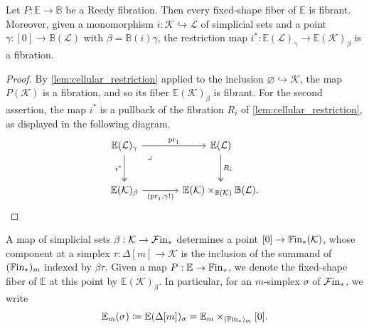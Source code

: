 \documentclass[10pt,reqno]{amsart}
\begin{document}
\begin{lemma}
\label{lem:fixed_shape_fiber_fibrant}
Let $P:\mathbb E\to\mathbb B$ be a Reedy fibration. Then every
fixed-shape fiber of $\mathbb E$ is fibrant. Moreover, given a
monomorphism $i:\mathcal K\hookrightarrow\mathcal L$ of simplicial
sets and a point $\gamma:[0]\to\mathbb B(\mathcal L)$ with
$\beta=\mathbb B(i)\gamma$, the restriction map
$i^*:\mathbb E(\mathcal L)_\gamma\to\mathbb E(\mathcal K)_\beta$ is
a fibration.
\end{lemma}
\begin{proof}
By \cref{lem:cellular_restriction} applied to the inclusion
$\varnothing\hookrightarrow\mathcal K$, the map $P(\mathcal K)$ is
a fibration, and so its fiber $\mathbb E(\mathcal K)_\beta$ is
fibrant. For the second assertion, the map $i^*$ is a pullback of
the fibration $R_i$ of \cref{lem:cellular_restriction}, as displayed
in the following diagram.
\[
\begin{tikzcd}[ampersand replacement=\&, sep=large]
\mathbb E(\mathcal L)_\gamma\arrow[r,"\pr_1"]
  \arrow[d,two heads,"i^*"']
  \arrow[dr,phantom,"\lrcorner",very near start]
\&\mathbb E(\mathcal L)\arrow[d,two heads,"R_i"]\\
\mathbb E(\mathcal K)_\beta\arrow[r,"{(\pr_1,\gamma !)}"']
\&\mathbb E(\mathcal K)\times_{\mathbb B(\mathcal K)}\mathbb B(\mathcal L).
\end{tikzcd}
\]
\end{proof}

\begin{notation}
\label{not:fixed_simplex_fibers}
A map of simplicial sets $\beta:\mathcal K\to\mathcal{F}\mathrm{in}_*$ determines a
point $[0]\to\mathbb{F}\mathrm{in}_*(\mathcal K)$, whose component at a simplex
$\tau:\Delta[m]\to\mathcal K$ is the inclusion of the summand of
$(\mathbb{F}\mathrm{in}_*)_m$ indexed by $\beta\tau$. Given a map
$P:\mathbb E\to\mathbb{F}\mathrm{in}_*$, we denote the fixed-shape fiber of
$\mathbb E$ at this point by $\mathbb E(\mathcal K)_\beta$. In
particular, for an $m$-simplex $\sigma$ of $\mathcal{F}\mathrm{in}_*$, we write
\[
\mathbb E_m(\sigma)\coloneqq\mathbb E(\Delta[m])_\sigma
=\mathbb E_m\times_{(\mathbb{F}\mathrm{in}_*)_m}[0].
\]
\end{notation}
\end{document}
